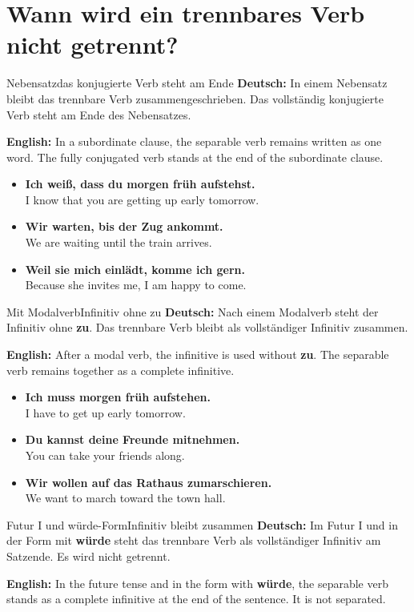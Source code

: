 \documentclass[a4paper,11pt]{article}
\newcommand{\GermanText}[1]{\textbf{Deutsch: }#1\par}
\newcommand{\EnglishText}[1]{{\small\color{SoftGray}\textbf{English: }#1\par}}
\newcommand{\ExampleItem}[2]{\item \textbf{#1}\\{\small\color{SoftGray}#2}}
\begin{document}
    \section{Wann wird ein trennbares Verb nicht getrennt?}

        \begin{grammarentry}{Nebensatz}{das konjugierte Verb steht am Ende}
            \GermanText{In einem Nebensatz bleibt das trennbare Verb zusammengeschrieben. Das vollständig konjugierte Verb steht am Ende des Nebensatzes.}
            \EnglishText{In a subordinate clause, the separable verb remains written as one word. The fully conjugated verb stands at the end of the subordinate clause.}
        \end{grammarentry}

        \begin{exbox}
            \begin{itemize}
                \ExampleItem{Ich weiß, dass du morgen früh aufstehst.}{I know that you are getting up early tomorrow.}
                \ExampleItem{Wir warten, bis der Zug ankommt.}{We are waiting until the train arrives.}
                \ExampleItem{Weil sie mich einlädt, komme ich gern.}{Because she invites me, I am happy to come.}
            \end{itemize}
        \end{exbox}

        \begin{grammarentry}{Mit Modalverb}{Infinitiv ohne \glqq zu\grqq}
            \GermanText{Nach einem Modalverb steht der Infinitiv ohne \textbf{zu}. Das trennbare Verb bleibt als vollständiger Infinitiv zusammen.}
            \EnglishText{After a modal verb, the infinitive is used without \textbf{zu}. The separable verb remains together as a complete infinitive.}
        \end{grammarentry}

        \begin{exbox}
            \begin{itemize}
                \ExampleItem{Ich muss morgen früh aufstehen.}{I have to get up early tomorrow.}
                \ExampleItem{Du kannst deine Freunde mitnehmen.}{You can take your friends along.}
                \ExampleItem{Wir wollen auf das Rathaus zumarschieren.}{We want to march toward the town hall.}
            \end{itemize}
        \end{exbox}

        \begin{grammarentry}{Futur I und \glqq würde\grqq-Form}{Infinitiv bleibt zusammen}
            \GermanText{Im Futur I und in der Form mit \textbf{würde} steht das trennbare Verb als vollständiger Infinitiv am Satzende. Es wird nicht getrennt.}
            \EnglishText{In the future tense and in the form with \textbf{würde}, the separable verb stands as a complete infinitive at the end of the sentence. It is not separated.}
        \end{grammarentry}
\end{document}
